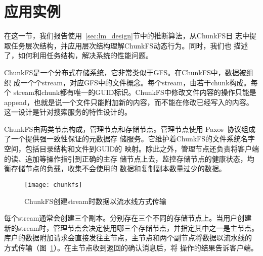 

\section{应用实例}
\label{sec:lm_case}





在这一节，我们报告使用~\ref{sec:lm_design}节中的推断算法，从ChunkFS日
志中提取任务层次结构，并应用层次结构理解ChunkFS动态行为。同时，我们也
描述了，如何利用任务结构，解决系统的性能问题。

ChunkFS是一个分布式存储系统，它非常类似于GFS。在ChunkFS中，数据被组织
成一个个stream，对应GFS中的文件概念。每个stream，由若干chunk构成。每个
stream和chunk都有唯一的GUID标识。ChunkFS中修改文件内容的操作只能是
append，也就是说一个文件只能附加新的内容，而不能在修改已经写入的内容。
这一设计是针对搜索服务的特性设计的。

ChunkFS由两类节点构成，管理节点和存储节点。管理节点使用
Paxos~\cite{paxos,paxossimple}协议组成了一个提供强一致性保证的元数据存
储服务。它维护着ChunkFS的文件系统名字空间，包括目录结构和文件到GUID的
映射。除此之外，管理节点还负责将客户端的读、追加等操作指引到正确的主存
储节点上去，监控存储节点的健康状态，均衡存储节点的负载，收集不会使用的
数据和复制副本数量过少的数据。

\begin{figure}[htbp]
  \centering
  \begin{minipage}{0.8\linewidth}
    \centering
    \texttt{[image: chunkfs]}
    \caption{ChunkFS创建stream时数据以流水线方式传输}
    \label{fig:chunkfspipe}
  \end{minipage}
\end{figure}

每个stream通常会创建三个副本。分别存在三个不同的存储节点上。当用户创建
新的stream时，管理节点会决定使用哪三个存储节点，并指定其中之一是主节点。
库户的数据附加请求会直接发往主节点，主节点和两个副节点将数据以流水线的
方式传输（图~\ref{fig:chunkfspipe}）。在主节点收到返回的确认消息后，将
操作的结果告诉客户端。

